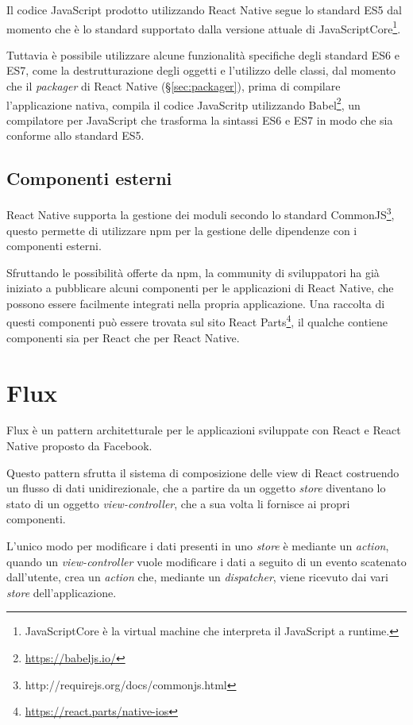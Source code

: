 Il codice JavaScript prodotto utilizzando React Native segue lo standard ES5 dal momento che è lo standard supportato dalla versione attuale di JavaScriptCore\footnote{JavaScriptCore è la virtual machine che interpreta il JavaScript a runtime.}.

Tuttavia è possibile utilizzare alcune funzionalità specifiche degli standard ES6 e ES7, come la destrutturazione degli oggetti e l'utilizzo delle classi, dal momento che il \textit{packager} di React Native (§\ref{sec:packager}), prima di compilare l'applicazione nativa, compila il codice JavaScritp utilizzando Babel\footnote{\url{https://babeljs.io/}}, un compilatore per JavaScript che trasforma la sintassi ES6 e ES7 in modo che sia conforme allo standard ES5.

\subsection{Componenti esterni}

React Native supporta la gestione dei moduli secondo lo standard CommonJS\footnote{http://requirejs.org/docs/commonjs.html}, questo permette di utilizzare npm per la gestione delle dipendenze con i componenti esterni.

Sfruttando le possibilità offerte da npm, la community di sviluppatori ha già iniziato a pubblicare alcuni componenti per le applicazioni di React Native, che possono essere facilmente integrati nella propria applicazione.
Una raccolta di questi componenti può essere trovata sul sito React Parts\footnote{\url{https://react.parts/native-ios}}, il qualche contiene componenti sia per React che per React Native.

\section{Flux}\label{sec:flux}
Flux è un pattern architetturale per le applicazioni sviluppate con React e React Native proposto da Facebook.

Questo pattern sfrutta il sistema di composizione delle view di React costruendo un flusso di dati unidirezionale, che a partire da un oggetto \textit{store} diventano lo stato di un oggetto \textit{view-controller}, che a sua volta li fornisce ai propri componenti.

L'unico modo per modificare i dati presenti in uno \textit{store} è mediante un \textit{action}, quando un \textit{view-controller} vuole modificare i dati a seguito di un evento scatenato dall'utente, crea un \textit{action} che, mediante un \textit{dispatcher}, viene ricevuto dai vari \textit{store} dell'applicazione.

